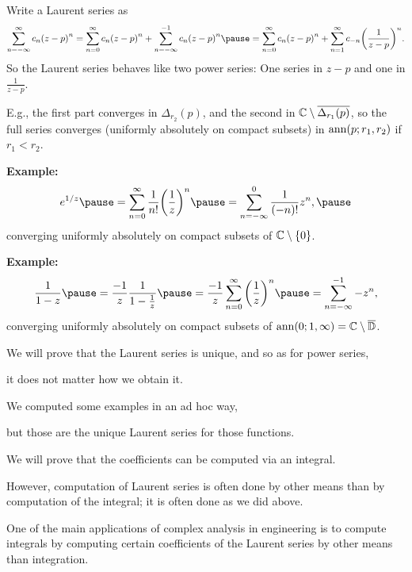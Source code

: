 \documentclass[10pt,aspectratio=169]{beamer}
\begin{document}
\begin{frame}
Write a Laurent series as 
\[
\sum_{n=-\infty}^{\infty} c_n {(z-p)}^n
=
\sum_{n=0}^{\infty} c_n {(z-p)}^n
+
\sum_{n=-\infty}^{-1} c_n {(z-p)}^n
\pause
=
\sum_{n=0}^{\infty} c_n {(z-p)}^n
+
\sum_{n=1}^{\infty} c_{-n} {\left(\frac{1}{z-p}\right)}^n .
\]
\pause
So the Laurent series behaves like two power series:
\pause
One series in $z-p$ and one in $\frac{1}{z-p}$.

\medskip
\pause

E.g., the first part converges in $\Delta_{r_2}(p)$, and the second
in ${\mathbb{C}} \setminus \overline{\Delta_{r_1}(p)}$, so the full series converges
(uniformly absolutely on compact subsets) in $\operatorname{ann}(p;r_1,r_2)$ if $r_1 < r_2$.

\medskip
\pause

\textbf{Example:}
\[
e^{1/z}
\pause
=
\sum_{n=0}^{\infty} \frac{1}{n!} {\left(\frac{1}{z}\right)}^n
\pause
=
\sum_{n=-\infty}^0 \frac{1}{(-n)!} z^n ,
\pause
\]
converging uniformly absolutely on compact subsets of ${\mathbb{C}} \setminus \{ 0 \}$.

\medskip
\pause

\textbf{Example:}
\[
\frac{1}{1-z}
\pause
=
\frac{-1}{z}
\frac{1}{1-\frac{1}{z}}
\pause
=
\frac{-1}{z}
\sum_{n=0}^\infty
{\left(\frac{1}{z}\right)}^n
\pause
=
\sum_{n=-\infty}^{-1}
- z^{n} ,
\]
converging uniformly absolutely on compact subsets of  $\operatorname{ann}(0;1,\infty) = {\mathbb{C}} \setminus \overline{{\mathbb{D}}}$.
\end{frame}

\begin{frame}
We will prove that the Laurent series is unique, and so
as for power series,

it does not matter how we obtain it.

\medskip
\pause

We computed some examples in an ad hoc way,

but those are the unique Laurent series for those functions.

\medskip
\pause

We will prove that the coefficients can be computed via
an integral.

\medskip
\pause

However, computation of Laurent series is often done by other means
than by computation of the integral; it is often done as we did above.


\medskip
\pause

One of the main applications of complex analysis in engineering
is to compute integrals by computing certain coefficients
of the Laurent series by other means than integration.
\end{frame}
\end{document}
